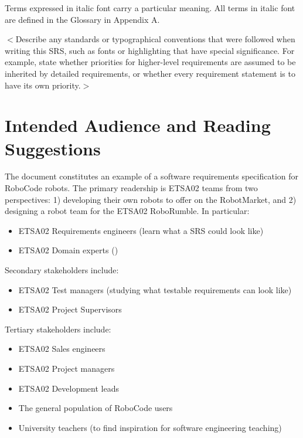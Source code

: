 \documentclass{scrreprt}
\begin{document}
Terms expressed in italic font carry a particular meaning. All terms in italic font are defined in the Glossary in Appendix A. 

$<$Describe any standards or typographical conventions that were followed when 
writing this SRS, such as fonts or highlighting that have special significance.  
For example, state whether priorities  for higher-level requirements are assumed 
to be inherited by detailed requirements, or whether every requirement statement 
is to have its own priority.$>$

\section{Intended Audience and Reading Suggestions}
The document constitutes an example of a software requirements specification for RoboCode robots. The primary readership is ETSA02 teams from two perspectives: 1) developing their own robots to offer on the RobotMarket, and 2) designing a robot team for the ETSA02 RoboRumble. In particular:

\begin{itemize}
\item ETSA02 Requirements engineers (learn what a SRS could look like)
\item ETSA02 Domain experts ()
\end{itemize}

Secondary stakeholders include:
\begin{itemize}
\item ETSA02 Test managers (studying what testable requirements can look like)
\item ETSA02 Project Supervisors
\end{itemize}

Tertiary stakeholders include:
\begin{itemize}
\item ETSA02 Sales engineers
\item ETSA02 Project managers
\item ETSA02 Development leads
\item The general population of RoboCode users
\item University teachers (to find inspiration for software engineering teaching)
\end{itemize}
\end{document}

